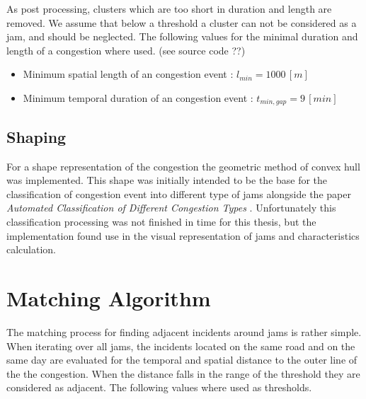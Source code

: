 As post processing, clusters which are too short in duration and length are removed. We assume that below a threshold a cluster can not be considered as a jam, and should be neglected. The following values for the minimal duration and length of a congestion where used. (see source code ??)

\begin{itemize}
	\item Minimum spatial length of an congestion event : $l_{min} = 1000 \,[m]$
	\item Minimum temporal duration of an congestion event : $t_{min,gap} = 9 \,[min]$
\end{itemize}

\subsection{Shaping}
\label{methodology_detection_shaping}
For a shape representation of the congestion the geometric method of convex hull was implemented. This shape was initially intended to be the base for the classification of congestion event into different type of jams alongside the paper \textit{Automated Classification of Different Congestion Types} \parencite{Kessler2020}. Unfortunately this classification processing was not finished in time for this thesis, but the implementation found use in the visual representation of jams and characteristics calculation.


\section{Matching Algorithm}
\label{methodology_matching}
The matching process for finding adjacent incidents around jams is rather simple. When iterating over all jams, the incidents located on the same road and on the same day are evaluated for the temporal and spatial distance to the outer line of the the congestion. When the distance falls in the range of the threshold they are considered as adjacent. The following values where used as thresholds.

